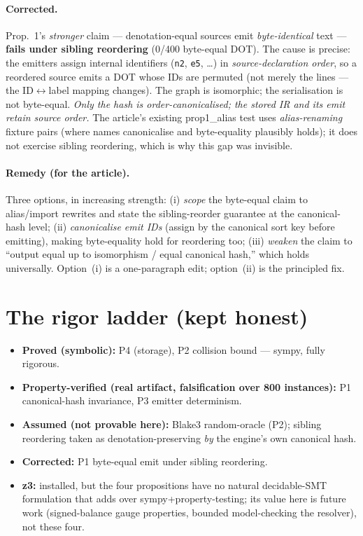 \documentclass[11pt]{article}
\begin{document}
\paragraph{Corrected.} Prop.~1's \emph{stronger} claim --- denotation-equal sources emit \emph{byte-identical}
text --- \textbf{fails under sibling reordering} (0/400 byte-equal DOT). The cause is precise: the emitters assign
internal identifiers (\texttt{n2}, \texttt{e5}, \dots) in \emph{source-declaration order}, so a reordered source
emits a DOT whose IDs are permuted (not merely the lines --- the ID$\leftrightarrow$label mapping changes). The
graph is isomorphic; the serialisation is not byte-equal. \emph{Only the hash is order-canonicalised; the stored
IR and its emit retain source order.} The article's existing \textsf{prop1\_alias} test uses
\emph{alias-renaming} fixture pairs (where names canonicalise and byte-equality plausibly holds); it does not
exercise sibling reordering, which is why this gap was invisible.

\paragraph{Remedy (for the article).} Three options, in increasing strength: (i) \emph{scope} the byte-equal
claim to alias/import rewrites and state the sibling-reorder guarantee at the canonical-hash level; (ii)
\emph{canonicalise emit IDs} (assign by the canonical sort key before emitting), making byte-equality hold for
reordering too; (iii) \emph{weaken} the claim to ``output equal up to isomorphism / equal canonical hash,'' which
holds universally. Option~(i) is a one-paragraph edit; option~(ii) is the principled fix.

\section{The rigor ladder (kept honest)}
\begin{itemize}\itemsep2pt
\item \textbf{Proved (symbolic):} P4 (storage), P2 collision bound --- \textsf{sympy}, fully rigorous.
\item \textbf{Property-verified (real artifact, falsification over 800 instances):} P1 canonical-hash
  invariance, P3 emitter determinism.
\item \textbf{Assumed (not provable here):} Blake3 random-oracle (P2); sibling reordering taken as
  denotation-preserving \emph{by} the engine's own canonical hash.
\item \textbf{Corrected:} P1 byte-equal emit under sibling reordering.
\item \textbf{z3:} installed, but the four propositions have no natural decidable-SMT formulation that adds over
  \textsf{sympy}+property-testing; its value here is future work (signed-balance gauge properties, bounded
  model-checking the resolver), not these four.
\end{itemize}
\end{document}
